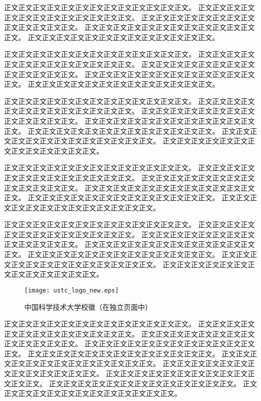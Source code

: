 正文正文正文正文正文正文正文正文正文正文正文正文正文。
正文正文正文正文正文正文正文正文正文正文正文正文正文。
正文正文正文正文正文正文正文正文正文正文正文正文正文。
正文正文正文正文正文正文正文正文正文正文正文正文正文。
正文正文正文正文正文正文正文正文正文正文正文正文正文。

正文正文正文正文正文正文正文正文正文正文正文正文正文。
正文正文正文正文正文正文正文正文正文正文正文正文正文。
正文正文正文正文正文正文正文正文正文正文正文正文正文。
正文正文正文正文正文正文正文正文正文正文正文正文正文。
正文正文正文正文正文正文正文正文正文正文正文正文正文。

正文正文正文正文正文正文正文正文正文正文正文正文正文。
正文正文正文正文正文正文正文正文正文正文正文正文正文。
正文正文正文正文正文正文正文正文正文正文正文正文正文。
正文正文正文正文正文正文正文正文正文正文正文正文正文。
正文正文正文正文正文正文正文正文正文正文正文正文正文。
正文正文正文正文正文正文正文正文正文正文正文正文正文。
正文正文正文正文正文正文正文正文正文正文正文正文正文。

正文正文正文正文正文正文正文正文正文正文正文正文正文。
正文正文正文正文正文正文正文正文正文正文正文正文正文。
正文正文正文正文正文正文正文正文正文正文正文正文正文。
正文正文正文正文正文正文正文正文正文正文正文正文正文。
正文正文正文正文正文正文正文正文正文正文正文正文正文。
正文正文正文正文正文正文正文正文正文正文正文正文正文。

正文正文正文正文正文正文正文正文正文正文正文正文正文。
正文正文正文正文正文正文正文正文正文正文正文正文正文。
正文正文正文正文正文正文正文正文正文正文正文正文正文。
正文正文正文正文正文正文正文正文正文正文正文正文正文。
正文正文正文正文正文正文正文正文正文正文正文正文正文。
正文正文正文正文正文正文正文正文正文正文正文正文正文。
正文正文正文正文正文正文正文正文正文正文正文正文正文。

\begin{figure}[p]
 \centering
 \texttt{[image: ustc\_logo\_new.eps]}
 \caption{中国科学技术大学校徽（在独立页面中）}
 \label{fig:amss4}
\end{figure}

正文正文正文正文正文正文正文正文正文正文正文正文正文。
正文正文正文正文正文正文正文正文正文正文正文正文正文。
正文正文正文正文正文正文正文正文正文正文正文正文正文。
正文正文正文正文正文正文正文正文正文正文正文正文正文。
正文正文正文正文正文正文正文正文正文正文正文正文正文。
正文正文正文正文正文正文正文正文正文正文正文正文正文。
正文正文正文正文正文正文正文正文正文正文正文正文正文。
正文正文正文正文正文正文正文正文正文正文正文正文正文。
正文正文正文正文正文正文正文正文正文正文正文正文正文。
正文正文正文正文正文正文正文正文正文正文正文正文正文。
